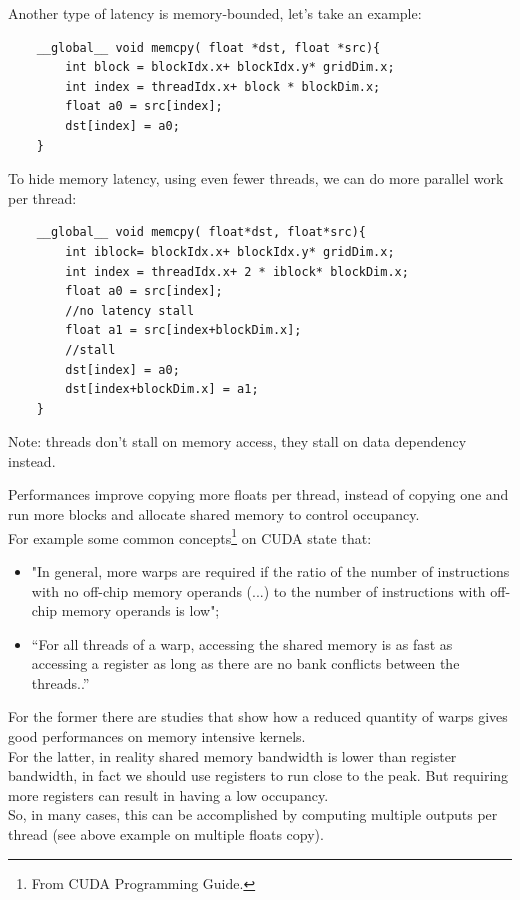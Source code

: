 Another type of latency is memory-bounded, let's take an example:
\begin{lstlisting}
	__global__ void memcpy( float *dst, float *src){
		int block = blockIdx.x+ blockIdx.y* gridDim.x;
		int index = threadIdx.x+ block * blockDim.x;
		float a0 = src[index];
		dst[index] = a0;
	}
\end{lstlisting}
To hide memory latency, using even fewer threads, we can do more parallel work per thread:
\begin{lstlisting}
	__global__ void memcpy( float*dst, float*src){
		int iblock= blockIdx.x+ blockIdx.y* gridDim.x;
		int index = threadIdx.x+ 2 * iblock* blockDim.x;
		float a0 = src[index]; 
		//no latency stall
		float a1 = src[index+blockDim.x]; 
		//stall
		dst[index] = a0;
		dst[index+blockDim.x] = a1;
	}
\end{lstlisting}
Note: threads don't stall on memory access, they stall on data dependency instead.

Performances improve copying more floats per thread, instead of copying one and run more blocks and allocate shared memory to control occupancy.\\
For example some common concepts\footnote{From CUDA Programming Guide.} on CUDA state that:
\begin{itemize}
\item "In general, more warps are required if the ratio of the number of instructions with no off-chip memory operands (...) to the number of instructions with off-chip memory operands is low";  %
\item “For all threads of a warp, accessing the shared memory is as fast as accessing a register as long as there are no bank conflicts between the threads..” 
\end{itemize}
For the former there are studies that show how a reduced quantity of warps gives good performances on memory intensive kernels.\\
For the latter, in reality shared memory bandwidth is lower than register bandwidth, in fact we should use registers to run close to the peak.
But requiring more registers can result in having a low occupancy.\\
So, in many cases, this can be accomplished by computing multiple outputs per thread (see above example on multiple floats copy)\cite{loweroccupancy,understandlatency}.


